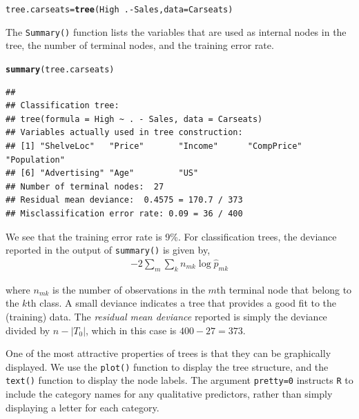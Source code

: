 \documentclass[12pt]{article}\usepackage[]{graphicx}\usepackage[]{color}
\makeatletter
\newcommand{\hlopt}[1]{\textcolor[rgb]{0,0,0}{#1}}%
\newcommand{\hlstd}[1]{\textcolor[rgb]{0.345,0.345,0.345}{#1}}%
\newcommand{\hlkwb}[1]{\textcolor[rgb]{0.69,0.353,0.396}{#1}}%
\newcommand{\hlkwc}[1]{\textcolor[rgb]{0.333,0.667,0.333}{#1}}%
\newcommand{\hlkwd}[1]{\textcolor[rgb]{0.737,0.353,0.396}{\textbf{#1}}}%
\newenvironment{kframe}{%
 \def\at@end@of@kframe{}%
 \ifinner\ifhmode%
  \def\at@end@of@kframe{\end{minipage}}%
  \begin{minipage}{\columnwidth}%
 \fi\fi%
 \def\FrameCommand##1{\hskip\@totalleftmargin \hskip-\fboxsep
 \colorbox{shadecolor}{##1}\hskip-\fboxsep
     \hskip-\linewidth \hskip-\@totalleftmargin \hskip\columnwidth}%
 \MakeFramed {\advance\hsize-\width
   \@totalleftmargin\z@ \linewidth\hsize
   \@setminipage}}%
 {\par\unskip\endMakeFramed%
 \at@end@of@kframe}
\newenvironment{knitrout}{}{} %
\makeatother
\begin{document}
\begin{knitrout}
\color{fgcolor}\begin{kframe}
\begin{alltt}
\hlstd{tree.carseats} \hlkwb{=} \hlkwd{tree}\hlstd{(High}\hlopt{~}\hlstd{.}\hlopt{-}\hlstd{Sales,} \hlkwc{data}\hlstd{=Carseats)}
\end{alltt}
\end{kframe}
\end{knitrout}

The \texttt{Summary()} function lists the variables that are used as internal nodes in the tree, the number of terminal nodes, and the training error rate.
\begin{knitrout}
\color{fgcolor}\begin{kframe}
\begin{alltt}
\hlkwd{summary}\hlstd{(tree.carseats)}
\end{alltt}
\begin{verbatim}
## 
## Classification tree:
## tree(formula = High ~ . - Sales, data = Carseats)
## Variables actually used in tree construction:
## [1] "ShelveLoc"   "Price"       "Income"      "CompPrice"   "Population" 
## [6] "Advertising" "Age"         "US"         
## Number of terminal nodes:  27 
## Residual mean deviance:  0.4575 = 170.7 / 373 
## Misclassification error rate: 0.09 = 36 / 400
\end{verbatim}
\end{kframe}
\end{knitrout}

We see that the training error rate is 9\%. For classification trees, the deviance reported in the output of \texttt{summary()} is given by,
\begin{align}
-2 \sum_m \sum_k n_{mk} \log \hat{p}_{mk}
\end{align}

where $n_{mk}$ is the number of observations in the $m$th terminal node that belong to the $k$th class. A small deviance indicates a tree that provides a good fit to the (training) data. The \textit{residual mean deviance} reported is simply the deviance divided by $n - |T_0|$, which in this case is $400-27=373$.


One of the most attractive properties of trees is that they can be graphically displayed. We use the \texttt{plot()} function to display the tree structure, and the \texttt{text()} function to display the node labels. The argument \texttt{pretty=0} instructs \texttt{R} to include the category names for any qualitative predictors, rather than simply displaying a letter for each category.
\end{document}
